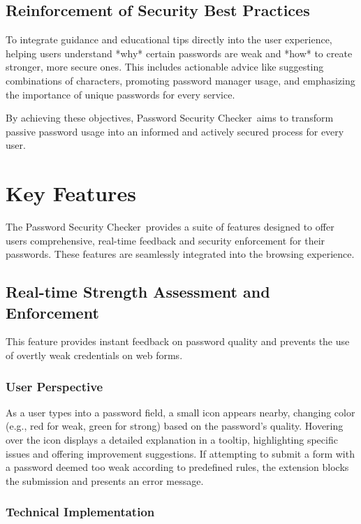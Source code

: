 \documentclass[11pt,oneside,a4paper]{book}
\newcommand{\extensionname}{Password Security Checker}
\begin{document}
\section{Reinforcement of Security Best Practices}
To integrate guidance and educational tips directly into the user experience, helping users understand *why* certain passwords are weak and *how* to create stronger, more secure ones. This includes actionable advice like suggesting combinations of characters, promoting password manager usage, and emphasizing the importance of unique passwords for every service.

By achieving these objectives, \extensionname\ aims to transform passive password usage into an informed and actively secured process for every user.

\chapter{Key Features}
The \extensionname\ provides a suite of features designed to offer users comprehensive, real-time feedback and security enforcement for their passwords. These features are seamlessly integrated into the browsing experience.

\section{Real-time Strength Assessment and Enforcement}
This feature provides instant feedback on password quality and prevents the use of overtly weak credentials on web forms.

\subsection{User Perspective}
As a user types into a password field, a small icon appears nearby, changing color (e.g., red for weak, green for strong) based on the password's quality. Hovering over the icon displays a detailed explanation in a tooltip, highlighting specific issues and offering improvement suggestions. If attempting to submit a form with a password deemed too weak according to predefined rules, the extension blocks the submission and presents an error message.

\subsection{Technical Implementation}
\end{document}

